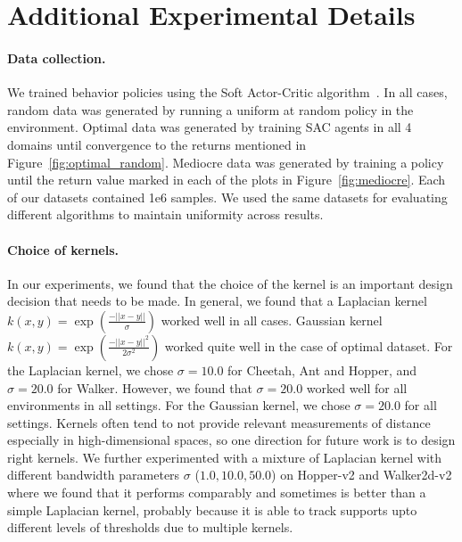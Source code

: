 


\section{Additional Experimental Details}
\label{app:bear_additional_details}

\paragraph{Data collection.} We trained behavior policies using the Soft Actor-Critic algorithm~\cite{haarnoja2018sac}. In all cases, random data was generated by running a uniform at random policy in the environment. Optimal data was generated by training SAC agents in all 4 domains until convergence to the returns mentioned in Figure~\ref{fig:optimal_random}. Mediocre data was generated by training a policy until the return value marked in each of the plots in Figure~\ref{fig:mediocre}. Each of our datasets contained 1e6 samples. We used the same datasets for evaluating different algorithms to maintain uniformity across results.

\paragraph{Choice of kernels.} In our experiments, we found that the choice of the kernel is an important design decision that needs to be made. In general, we found that a Laplacian kernel $k(x, y) = \exp(\frac{-||x - y||}{\sigma})$ worked well in all cases. Gaussian kernel $k(x, y) =\exp(\frac{-||x - y||^2}{2 \sigma^2})$ worked quite well in the case of optimal dataset. For the Laplacian kernel, we chose $\sigma = 10.0$ for Cheetah, Ant and Hopper, and $\sigma=20.0$ for Walker. However, we found that $\sigma=20.0$ worked well for all environments in all settings. For the Gaussian kernel, we chose $\sigma=20.0$ for all settings. Kernels often tend to not provide relevant measurements of distance especially in high-dimensional spaces, so one direction for future work is to design right kernels. We further experimented with a mixture of Laplacian kernel with different bandwidth parameters $\sigma$ ($1.0, 10.0, 50.0$) on Hopper-v2 and Walker2d-v2 where we found that it performs comparably and sometimes is better than a simple Laplacian kernel, probably because it is able to track supports upto different levels of thresholds due to multiple kernels.   

